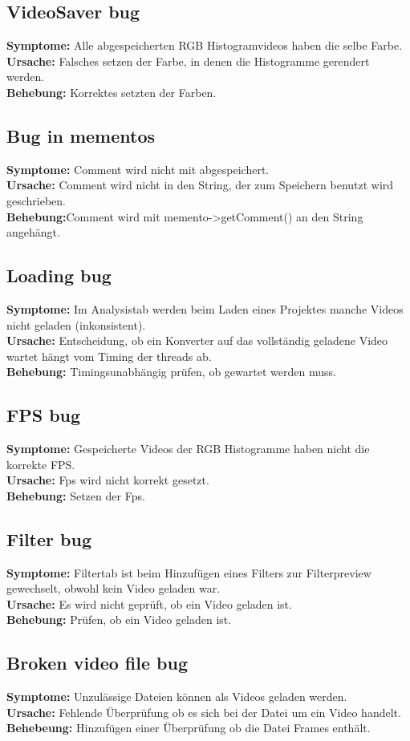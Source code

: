 \documentclass{scrartcl}
\begin{document}
{\subsection{VideoSaver bug}
\textbf{Symptome:}
Alle abgespeicherten RGB Histogramvideos haben die selbe Farbe.\\
\textbf{Ursache:}
Falsches setzen der Farbe, in denen die Histogramme gerendert werden.\\
\textbf{Behebung:}
Korrektes setzten der Farben.
\subsection{Bug in mementos}
\textbf{Symptome:} Comment wird nicht mit abgespeichert.\\
\textbf{Ursache:} Comment wird nicht in den String, der zum Speichern benutzt wird geschrieben.\\
\textbf{Behebung:}Comment wird mit memento->getComment() an den String angehängt.
\subsection{Loading bug}
\textbf{Symptome:}
Im Analysistab werden beim Laden eines Projektes manche Videos nicht geladen (inkonsistent).\\
\textbf{Ursache:}
Entscheidung, ob ein Konverter auf das vollständig geladene Video wartet hängt vom Timing der threads ab.\\
\textbf{Behebung:}
Timingsunabhängig prüfen, ob gewartet werden muss.
\subsection{FPS bug}
\textbf{Symptome:}
Gespeicherte Videos der RGB Histogramme haben nicht die korrekte FPS.\\
\textbf{Ursache:}
Fps wird nicht korrekt gesetzt.\\
\textbf{Behebung:}
Setzen der Fps.
\subsection{Filter bug}
\textbf{Symptome:}
Filtertab ist beim Hinzufügen eines Filters zur Filterpreview gewechselt, obwohl kein Video geladen war.\\
\textbf{Ursache:}
Es wird nicht geprüft, ob ein Video geladen ist.\\
\textbf{Behebung:}
Prüfen, ob ein Video geladen ist.
\subsection{Broken video file bug}
\textbf{Symptome:} Unzulässige Dateien können als Videos geladen werden.\\
\textbf{Ursache:} Fehlende Überprüfung ob es sich bei der Datei um ein Video handelt.\\
\textbf{Behebeung:} Hinzufügen einer Überprüfung ob die Datei Frames enthält.
}
\end{document}
